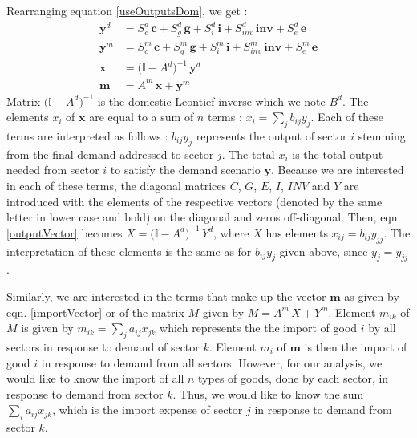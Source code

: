 \documentclass[12pt,english]{article}
\begin{document}
Rearranging equation \ref{useOutputsDom}, we get :
\begin{align}
\boldsymbol{y}^d &= S^d_{c} \, \boldsymbol{c} + S^d_{g} \, \boldsymbol{g} + S^d_{i} \, \boldsymbol{i} + S^d_{inv} \, \boldsymbol{inv} + S^d_{e} \, \boldsymbol{e} \nonumber \\
\boldsymbol{y}^m &= S^m_{c} \, \boldsymbol{c} + S^m_{g} \, \boldsymbol{g} + S^m_{i} \, \boldsymbol{i} + S^m_{inv} \, \boldsymbol{inv} + S^m_{e} \, \boldsymbol{e} \nonumber  \\
\boldsymbol{x} &= \big(\mathbb{I} - A^d \big)^{-1} \, \boldsymbol{y}^d \label{outputVector} \\
\boldsymbol{m} &= A^m \, \boldsymbol{x} + \boldsymbol{y}^m \label{importVector} 
\end{align}
Matrix $\big(\mathbb{I} - A^d \big)^{-1}$ is the domestic Leontief inverse which we note $B^d$. The elements $x_i$ of $\boldsymbol{x}$ are equal to a sum of $n$ terms : $x_i = \sum_j b_{ij}y_j$. Each of these terms are interpreted as follows : $b_{ij}y_j$ represents the output of sector $i$ stemming from the final demand addressed to sector $j$. The total $x_i$ is the total output needed from sector $i$ to satisfy the demand scenario $\boldsymbol{y}$. Because we are interested in each of these terms, the diagonal matrices $C$, $G$, $E$, $I$, $INV$ and $Y$ are introduced with the elements of the respective vectors (denoted by the same letter in lower case and bold) on the diagonal and zeros off-diagonal. Then, eqn. \ref{outputVector} becomes $X = \big(\mathbb{I} - A^d \big)^{-1} \, Y^d$, where $X$ has elements $x_{ij} = b_{ij}y_{jj}$. The interpretation of these elements is the same as for $b_{ij}y_j$ given above, since $y_j = y_{jj}$.

Similarly, we are interested in the terms that make up the vector $\boldsymbol{m}$ as given by eqn. \ref{importVector} or of the matrix $M$ given by $M = A^m \, X + Y^m$. Element $m_{ik}$ of $M$ is given by $m_{ik} = \sum_j a_{ij}x_{jk}$ which represents the the import of good $i$ by all sectors in response to demand of sector $k$. Element $m_i$ of $\boldsymbol{m}$ is then the import of good $i$ in response to demand from all sectors. However, for our analysis, we would like to know the import of all $n$ types of goods, done by each sector, in response to demand from sector $k$. Thus, we would like to know the sum $\sum_i a_{ij}x_{jk}$, which is the import expense of sector $j$ in response to demand from sector $k$. 
\end{document}
